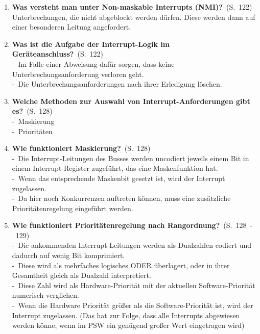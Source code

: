 \documentclass[a4paper,12pt]{article}
\newcommand{\question}[3]{\pagebreak[3]\item {\textbf{#1?}}\ (S.\ #2)#3}
\newcommand{\catchword}[1]{\\-\ #1}
\newcommand{\normaltext}[1]{\\#1}
\newcommand{\page}[1]{#1}
\newcommand{\pages}[2]{#1\ -\ #2}
\begin{document}
\begin{enumerate}
  \question{Was versteht man unter Non-maskable Interrupts (NMI)}{\page{122}}
  {
    \normaltext{Unterbrechungen, die nicht abgeblockt werden dürfen. Diese werden dann auf einer 
    besonderen Leitung angefordert.}
  }

  \question{Was ist die Aufgabe der Interrupt-Logik im Geräteanschluss}{\page{122}}
  {
    \catchword{Im Falle einer Abweisung dafür sorgen, dass keine Unterbrechungsanforderung verloren geht.}
    \catchword{Die Unterbrechungsanforderungen nach ihrer Erledigung löschen.}
  }

   \question{Welche Methoden zur Auswahl von Interrupt-Anforderungen gibt es}{\page{128}}
  {
    \catchword{Maskierung}
    \catchword{Prioritäten}
  }

  \question{Wie funktioniert Maskierung}{\page{128}}
  {
    \catchword{Die Interrupt-Leitungen des Busses werden uncodiert jeweils einem Bit in einem 
    Interrupt-Register zugeführt, das eine Maskenfunktion hat.}
    \catchword{Wenn das entsprechende Maskenbit gesetzt ist, wird der Interrupt zugelassen.}
    \catchword{Da hier noch Konkurrenzen auftreten können, muss eine zusätzliche Prioritätenregelung 
    eingeführt werden.}
  }

   \question{Wie funktioniert Prioritätenregelung nach Rangordnung}{\pages{128}{129}}
  {
    \catchword{Die ankommenden Interrupt-Leitungen werden als Dualzahlen codiert und dadurch auf wenig 
    Bit komprimiert.}
    \catchword{Diese wird als mehrfaches logisches ODER überlagert, oder in ihrer Gesamtheit gleich 
    als Dualzahl interpretiert.}
    \catchword{Diese Zahl wird als Hardware-Priorität mit der aktuellen Software-Priorität numerisch 
    verglichen.}
    \catchword{Wenn die Hardware Priorität größer als die Software-Priorität ist, wird der Interrupt
    zugelassen. (Das hat zur Folge, dass alle Interrupts abgewiesen werden könne, wenn im PSW ein genügend
    großer Wert eingetragen wird)}
  }


\end{enumerate}
\end{document}
